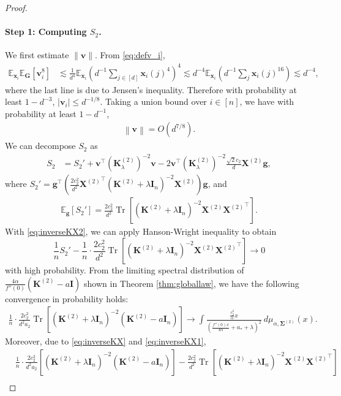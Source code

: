 \documentclass[twoside,11pt]{article}
\newcommand{\norm}[1]{\left\|#1\right\|}
\newcommand{\E}{\mathbb{E}}
\def\bI{{\mathbf I}}
\def\bG{{\boldsymbol G}}
\def\bK{{\boldsymbol K}}
\def\bX{{\boldsymbol X}}
\def\bg{{\boldsymbol g}}
\def\bv{{\boldsymbol v}}
\def\bx{{\boldsymbol x}}
\def\bSigma{{\boldsymbol \Sigma}}
\renewcommand{\bK}{\boldsymbol{K}}
\newcommand{\Tr}{\operatorname{Tr}}
\newcommand{\1}{\mathbf{1}}
\begin{document}
\begin{proof}
          \paragraph{Step 1: Computing $S_2$.} 
We first estimate $\|\bv\|$. From \eqref{eq:defv_i},
\begin{align}
    \E_{\bx_i}\E_{\bG}[\bv_i^{8}]&\lesssim \frac{1}{d^4}\E_{\bx_i}\left(d^{-1} \sum_{j\in [d]}\bx_i(j)^4\right)^4 \lesssim d^{-4} \E_{\bx_i}\left( d^{-1} \sum_{j} \bx_i(j)^{16}\right)\lesssim d^{-4},
\end{align}
where the last line is due to Jensen's inequality. Therefore with probability at least $1-d^{-3}$, $|\bv_i|\leq d^{-1/8}$. Taking a union bound over $i\in [n]$, we have with probability at least $1-d^{-1}$, 
\begin{align}\label{eq:norm_bv}
    \norm{\bv}=O(d^{7/8}).
\end{align}
We can decompose $S_2$ as 
\begin{align}
    S_2&=S_2'+\bv^\top\left( \bK_{\lambda}^{(2)}\right)^{-2}\bv -2\bv^\top\left( \bK_{\lambda}^{(2)}\right)^{-2}\frac{\sqrt 2 c_2}{d}\bX^{(2)}\bg, \label{eq:S2_3term}
\end{align}
where
    $S_2'=\bg^\top \left(\frac{2c_2^2}{d^2}  {\bX^{(2)}}^\top (\bK^{(2)} +\lambda\bI_n)^{-2} \bX^{(2)}\right)\bg$,
and
     \begin{align}
       \E_{\bg}[S_2']=\frac{2c_2^2}{d^2}\Tr  \left[ (\bK^{(2)} +\lambda\bI_n)^{-2}\bX^{(2)}{\bX^{(2)}}^\top\right].
     \end{align}
With \eqref{eq:inverseKX2}, we can apply Hanson-Wright inequality \citep{vershynin2018high} to obtain  
  \[  \frac{1}{n} S_2'-\frac{1}{n}\cdot \frac{2c_2^2}{d^2}\Tr  \left[ (\bK^{(2)} +\lambda\bI_n)^{-2}\bX^{(2)}{\bX^{(2)}}^\top\right]\to 0\] with high probability. From the  limiting spectral distribution of $\frac{4\alpha}{f''(0)}(\bK^{(2)}-a \bI)$ shown in Theorem \ref{thm:globallaw}, we have the following convergence in probability holds: 
\begin{align}
    \frac{1}{n}\cdot \frac{2c_2^2}{d^2a_2}\Tr  \left[ (\bK^{(2)} +\lambda\bI_n)^{-2}(\bK^{(2)}-a\bI_n)\right] \to \int \frac{\frac{c_2^2}{\alpha} x}{\left( \frac{f''(0)x}{4\alpha}+a_*+\lambda \right)^2}~d\mu_{\alpha,\bSigma^{(2)}}(x).
\end{align}
Moreover, due to \eqref{eq:inverseKX} and \eqref{eq:inverseKX1},
\begin{align}
&\frac{1}{n}\cdot \frac{2c_2^2}{d^2 a_2}\left[ (\bK^{(2)} +\lambda\bI_n)^{-2}(\bK^{(2)}-a\bI_n)\right]-\frac{2c_2^2}{d^2}\Tr  \left[ (\bK^{(2)} +\lambda\bI_n)^{-2}\bX^{(2)}{\bX^{(2)}}^\top\right]\\

\end{align}
\end{proof}
\end{document}
